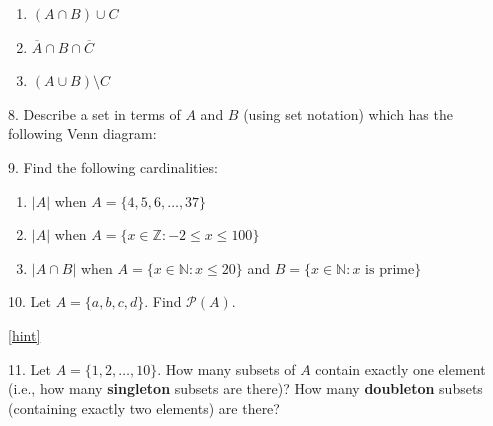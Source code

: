 \documentclass[10pt,]{book}
\newcommand{\terminology}[1]{\textbf{#1}}
\theoremstyle{plain}
\theoremstyle{definition}
\theoremstyle{definition}
\theoremstyle{definition}
\numberwithin{equation}{chapter}
\def\N{\mathbb N}
\def\Z{\mathbb Z}
\def\pow{\mathcal P}
\def\st{:}
\begin{document}
\begin{exerciselist}
\begin{enumerate}[label=(\alph*)]
\item\hypertarget{li-346}{}\((A \cap B) \cup C\)%
\item\hypertarget{li-347}{}\(\overline A \cap B \cap \overline C\)%
\item\hypertarget{li-348}{}\((A \cup B) \setminus C\)%
\end{enumerate}
%
\par\smallskip
\item[8.]\hypertarget{exercise-73}{}\hypertarget{p-2063}{}%
Describe a set in terms of \(A\) and \(B\) (using set notation) which has the following Venn diagram:%
\begin{sidebyside}{1}{0.4}{0.4}{0}
\begin{sbspanel}{0.2}
\end{sbspanel}
\end{sidebyside}
\par\smallskip
\item[9.]\hypertarget{exercise-74}{}\hypertarget{p-2064}{}%
Find the following cardinalities: \leavevmode%
\begin{enumerate}[label=(\alph*)]
\item\hypertarget{li-355}{}\(|A|\) when \(A = \{4,5,6,\ldots,37\}\)%
\item\hypertarget{li-356}{}\(|A|\) when \(A = \{x \in \Z \st -2 \le x \le 100\}\)%
\item\hypertarget{li-357}{}\(|A \cap B|\) when \(A = \{x \in \N \st x \le 20\}\) and \(B = \{x \in \N \st x \mbox{ is prime} \}\)%
\end{enumerate}
%
\par\smallskip
\item[10.]\hypertarget{exercise-75}{}\hypertarget{p-2069}{}%
Let \(A = \{a, b, c, d\}\). Find \(\pow(A)\).%
\par\smallskip
\hfill{\tiny\hyperlink{a-B.2.10}{[hint]}\hypertarget{q-B.2.10}{}}\item[11.]\hypertarget{exercise-76}{}\hypertarget{p-2071}{}%
Let \(A = \{1,2,\ldots, 10\}\). How many subsets of \(A\) contain exactly one element (i.e., how many \terminology{singleton} subsets are there)? How many \terminology{doubleton} subsets (containing exactly two elements) are there?%

\end{exerciselist}
\end{document}
